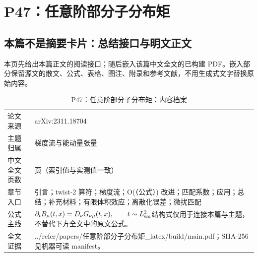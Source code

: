 \documentclass[UTF8,11pt,oneside]{ctexbook}
\begin{document}
\chapter{P47：任意阶部分子分布矩}
\section*{本篇不是摘要卡片：总结接口与明文正文}
本页先给出本篇正文的阅读接口；随后嵌入该篇中文全文的已构建 PDF。嵌入部分保留源文的散文、公式、表格、图注、附录和参考文献，不用生成式文字替换原始内容。
\begin{table}[htbp]
  \centering
  \caption{P47：任意阶部分子分布矩：内容档案}
  \small
  \begin{tabularx}{0.96\textwidth}{@{}p{3.3cm}>{\raggedright\arraybackslash}X@{}}
    \toprule
    论文来源 & arXiv:2311.18704 \\
    主题归属 & 梯度流与能动量张量 \\
    中文全文页数 & 13 页（索引值与实测值一致） \\
    章节入口 & 引言；twist-2 算符；梯度流；O(（公式）) 改进；匹配系数；应用；总结；补充材料；有限体积效应；离散化误差；微扰匹配 \\
    公式主线 & $\partial_t B_\mu(t,x)=D_\nu G_{\nu\mu}(t,x),\qquad t\sim L_{\rm sm}^{2}$\newline\scriptsize 结构式仅用于连接本篇与主题，不替代下方全文中的原文公式。 \\
    全文证据 & ../\allowbreak{}refer/\allowbreak{}papers/\allowbreak{}任意阶部分子分布矩\_\allowbreak{}latex/\allowbreak{}build/\allowbreak{}main.pdf；SHA-256 见机器可读 manifest。 \\
    \bottomrule
  \end{tabularx}
\end{table}
\end{document}
